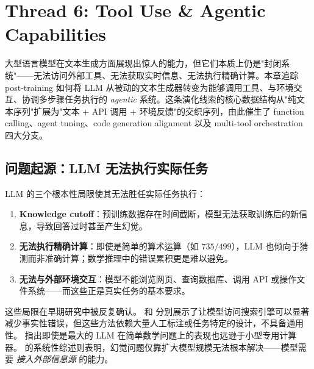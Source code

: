 
\section{Thread 6: Tool Use \& Agentic Capabilities}
\label{sec:t6}

大型语言模型在文本生成方面展现出惊人的能力，但它们本质上仍是"封闭系统"——无法访问外部工具、无法获取实时信息、无法执行精确计算。本章追踪 post-training 如何将 LLM 从被动的文本生成器转变为能够调用工具、与环境交互、协调多步骤任务执行的 \emph{agentic} 系统。这条演化线索的核心数据结构从"纯文本序列"扩展为"文本 + API 调用 + 环境反馈"的交织序列，由此催生了 function calling、agent tuning、code generation alignment 以及 multi-tool orchestration 四大分支。



\subsection{问题起源：LLM 无法执行实际任务}
\label{sec:t6-origin}

\begin{problembox}
LLM 的三个根本性局限使其无法胜任实际任务执行：
\begin{enumerate}[leftmargin=*]
  \item \textbf{Knowledge cutoff}：预训练数据存在时间截断，模型无法获取训练后的新信息，导致回答过时甚至产生幻觉。
  \item \textbf{无法执行精确计算}：即使是简单的算术运算（如 $735/499$），LLM 也倾向于猜测而非准确计算；数学推理中的错误累积更是难以避免。
  \item \textbf{无法与外部环境交互}：模型不能浏览网页、查询数据库、调用 API 或操作文件系统——而这些正是真实任务的基本要求。
\end{enumerate}
\end{problembox}

这些局限在早期研究中被反复确认。\citet{komeili2022internet} 和 \citet{thoppilan2022lamda} 分别展示了让模型访问搜索引擎可以显著减少事实性错误，但这些方法依赖大量人工标注或任务特定的设计，不具备通用性。\citet{patel2021nlp} 指出即使是最大的 LLM 在简单数学问题上的表现也远逊于小型专用计算器。\citet{ji2022hallucination} 的系统性综述则表明，幻觉问题仅靠扩大模型规模无法根本解决——模型需要 \emph{接入外部信息源} 的能力。

